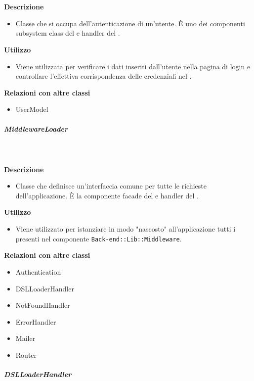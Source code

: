         \textbf{\\ \\ Descrizione} 
          \begin{itemize}
            \item[] Classe che si occupa dell'autenticazione di un'utente. È uno dei componenti subsystem class del   e handler del  .
          \end{itemize}      
        \textbf{Utilizzo}  
          \begin{itemize}
            \item[] Viene utilizzata per verificare i dati inseriti dall'utente nella pagina di login e controllare l'effettiva corrispondenza delle credenziali nel .
          \end{itemize}
          \textbf{Relazioni con altre classi}
          \begin{itemize}
              \item{UserModel}
          \end{itemize}
      \subparagraph{MiddlewareLoader}
        
        \textbf{\\ \\ Descrizione} 
          \begin{itemize}
            \item[] Classe che definisce un'interfaccia comune per tutte le richieste dell'applicazione. È la componente facade del   e handler del  .
          \end{itemize}      
        \textbf{Utilizzo}  
          \begin{itemize}
            \item[] Viene utilizzato per istanziare in modo "nascosto" all'applicazione tutti i  presenti nel componente \texttt{Back-end::Lib::Middleware}.
          \end{itemize}
          \textbf{Relazioni con altre classi}
          \begin{itemize}
              \item{Authentication}
              \item{DSLLoaderHandler}
              \item{NotFoundHandler}
              \item{ErrorHandler}
              \item{Mailer}
              \item{Router}
          \end{itemize}
      \subparagraph{DSLLoaderHandler}
        
